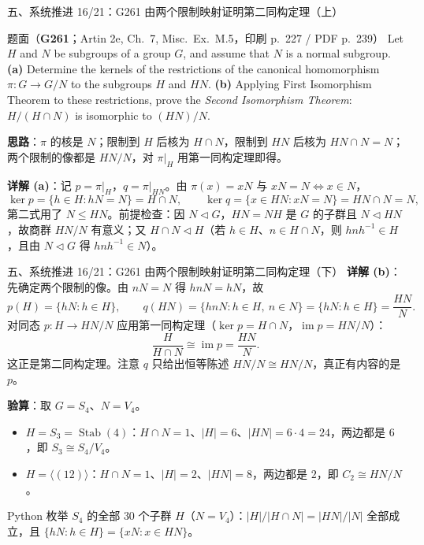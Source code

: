 \documentclass[aspectratio=169,10pt,fontset=none]{ctexbeamer}
\newcommand{\ex}[1]{\textcolor{accent}{\footnotesize\bfseries #1}}
\newcommand{\key}[1]{\textcolor{ink}{\bfseries #1}}
\begin{document}
\begin{frame}[t]{五、系统推进 16/21：G261 由两个限制映射证明第二同构定理（上）}
\label{ex:G261}
\scriptsize
\begin{block}{\footnotesize 题面（\ex{G261}；Artin 2e, Ch.~7, Misc.\ Ex.~M.5，印刷 p.~227 / PDF p.~239）}
Let $H$ and $N$ be subgroups of a group $G$, and assume that $N$ is a normal subgroup. \textbf{(a)} Determine the kernels of the restrictions of the canonical homomorphism $\pi:G\to G/N$ to the subgroups $H$ and $HN$. \textbf{(b)} Applying First Isomorphism Theorem to these restrictions, prove the \emph{Second Isomorphism Theorem}: $H/(H\cap N)$ is isomorphic to $(HN)/N$.
\end{block}
\key{思路}：$\pi$ 的核是 $N$；限制到 $H$ 后核为 $H\cap N$，限制到 $HN$ 后核为 $HN\cap N=N$；两个限制的像都是 $HN/N$，对 $\pi|_H$ 用第一同构定理即得。

\key{详解 (a)}：记 $p=\pi|_H$，$q=\pi|_{HN}$。由 $\pi(x)=xN$ 与 $xN=N\iff x\in N$，
\[ \ker p=\{h\in H:hN=N\}=H\cap N,\qquad \ker q=\{x\in HN:xN=N\}=HN\cap N=N, \]
第二式用了 $N\le HN$。前提检查：因 $N\triangleleft G$，$HN=NH$ 是 $G$ 的子群且 $N\triangleleft HN$，故商群 $HN/N$ 有意义；又 $H\cap N\triangleleft H$（若 $h\in H$、$n\in H\cap N$，则 $hnh^{-1}\in H$，且由 $N\triangleleft G$ 得 $hnh^{-1}\in N$）。
\end{frame}

\begin{frame}[t]{五、系统推进 16/21：G261 由两个限制映射证明第二同构定理（下）}
\scriptsize
\key{详解 (b)}：先确定两个限制的像。由 $nN=N$ 得 $hnN=hN$，故
\[ p(H)=\{hN:h\in H\},\qquad q(HN)=\{hnN:h\in H,\ n\in N\}=\{hN:h\in H\}=\frac{HN}{N}. \]
对同态 $p:H\to HN/N$ 应用第一同构定理（$\ker p=H\cap N$，$\operatorname{im}p=HN/N$）：
\[ \frac{H}{H\cap N}\cong\operatorname{im}p=\frac{HN}{N}. \]
这正是第二同构定理。注意 $q$ 只给出恒等陈述 $HN/N\cong HN/N$，真正有内容的是 $p$。

\key{验算}：取 $G=S_4$、$N=V_4$。
\begin{itemize}
\item $H=S_3=\operatorname{Stab}(4)$：$H\cap N=1$、$|H|=6$、$|HN|=6\cdot4=24$，两边都是 $6$，即 $S_3\cong S_4/V_4$。
\item $H=\langle(12)\rangle$：$H\cap N=1$、$|H|=2$、$|HN|=8$，两边都是 $2$，即 $C_2\cong HN/N$。
\end{itemize}
Python 枚举 $S_4$ 的全部 $30$ 个子群 $H$（$N=V_4$）：$|H|/|H\cap N|=|HN|/|N|$ 全部成立，且 $\{hN:h\in H\}=\{xN:x\in HN\}$。
\end{frame}
\end{document}
